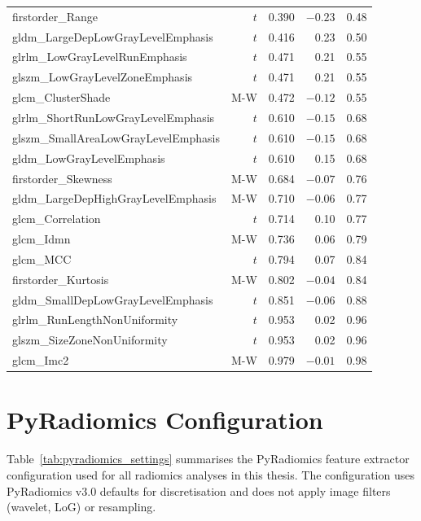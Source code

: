 \begin{appendices}
\begin{longtable}{p{6.5cm}rrrr}
firstorder\_Range & $t$ & 0.390 & $-0.23$ & 0.48 \\
gldm\_LargeDepLowGrayLevelEmphasis & $t$ & 0.416 & 0.23 & 0.50 \\
glrlm\_LowGrayLevelRunEmphasis & $t$ & 0.471 & 0.21 & 0.55 \\
glszm\_LowGrayLevelZoneEmphasis & $t$ & 0.471 & 0.21 & 0.55 \\
glcm\_ClusterShade & M-W & 0.472 & $-0.12$ & 0.55 \\
glrlm\_ShortRunLowGrayLevelEmphasis & $t$ & 0.610 & $-0.15$ & 0.68 \\
glszm\_SmallAreaLowGrayLevelEmphasis & $t$ & 0.610 & $-0.15$ & 0.68 \\
gldm\_LowGrayLevelEmphasis & $t$ & 0.610 & 0.15 & 0.68 \\
firstorder\_Skewness & M-W & 0.684 & $-0.07$ & 0.76 \\
gldm\_LargeDepHighGrayLevelEmphasis & M-W & 0.710 & $-0.06$ & 0.77 \\
glcm\_Correlation & $t$ & 0.714 & 0.10 & 0.77 \\
glcm\_Idmn & M-W & 0.736 & 0.06 & 0.79 \\
glcm\_MCC & $t$ & 0.794 & 0.07 & 0.84 \\
firstorder\_Kurtosis & M-W & 0.802 & $-0.04$ & 0.84 \\
gldm\_SmallDepLowGrayLevelEmphasis & $t$ & 0.851 & $-0.06$ & 0.88 \\
glrlm\_RunLengthNonUniformity & $t$ & 0.953 & 0.02 & 0.96 \\
glszm\_SizeZoneNonUniformity & $t$ & 0.953 & 0.02 & 0.96 \\
glcm\_Imc2 & M-W & 0.979 & $-0.01$ & 0.98 \\
\end{longtable}
\normalsize


\chapter{PyRadiomics Configuration}
\label{app:pyradiomics_config}

Table~\ref{tab:pyradiomics_settings} summarises the PyRadiomics feature extractor configuration used for all radiomics analyses in this thesis. The configuration uses PyRadiomics v3.0 defaults for discretisation and does not apply image filters (wavelet, LoG) or resampling.


\end{appendices}
